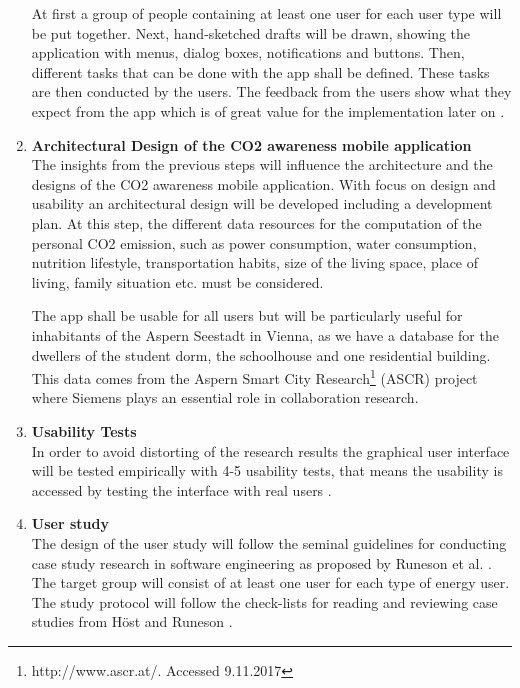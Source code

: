\begin{enumerate}
	At first a group of people containing at least one user for each user type will be put together.  Next, hand-sketched drafts will be drawn, showing the application with menus, dialog boxes, notifications and buttons. Then, different tasks that can be done with the app shall be defined. These tasks are then conducted by the users. The feedback from the users show what they expect from the app which is of great value for the implementation later on \cite{snyder2003paper}.
	
	\item \textbf{Architectural Design of the CO2 awareness mobile application} \\
	The insights from the previous steps will influence the architecture and the designs of the CO2 awareness mobile application. With focus on design and usability an architectural design will be developed including a development plan. At this step, the different data resources for the computation of the personal CO2 emission, such as power consumption, water consumption, nutrition lifestyle, transportation habits, size of the living space, place of living, family situation etc. must be considered.
	
	The app shall be usable for all users but will be particularly useful for inhabitants of the Aspern Seestadt in Vienna, as we have a database for the dwellers of the student dorm, the schoolhouse and one residential building. This data comes from the Aspern Smart City Research\footnote{http://www.ascr.at/. Accessed 9.11.2017} (ASCR) project where Siemens plays an essential role in collaboration research. 
		
	\item \textbf{Usability Tests} \\
	In order to avoid distorting of the research results the graphical user interface will be tested empirically with 4-5 usability tests, that means the usability is accessed by testing the interface with real users \cite{nielsen1994usability}.
	
	\item \textbf{User study} \\
	The design of the user study will follow the seminal guidelines for conducting case study research in software engineering as proposed by Runeson et al. \cite{runeson2012case}. The target group will consist of at least one user for each type of energy user. The study protocol will follow the check-lists for reading and reviewing case studies from H\"ost and Runeson \cite{host2007checklists}.
	

\end{enumerate}
